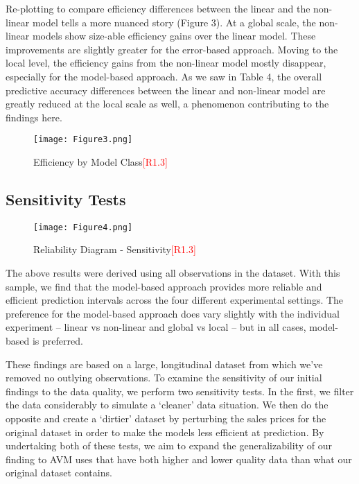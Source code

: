 \documentclass[colTwo]{anon}
\theoremstyle{definition}
\begin{document}
Re-plotting to compare efficiency differences between the linear and the non-linear model tells a more nuanced story (Figure 3). At a global scale, the non-linear models show size-able efficiency gains over the linear model. These improvements are slightly greater for the error-based approach. Moving to the local level, the efficiency gains from the non-linear model mostly disappear, especially for the model-based approach. As we saw in Table 4, the overall predictive accuracy differences between the linear and non-linear model are greatly reduced at the local scale as well, a phenomenon contributing to the findings here. 

\begin{figure}[h!]
\centering
\texttt{[image: Figure3.png]}
\caption{Efficiency by Model Class\textcolor{red}{[R1.3]}}
\label{fig:effmc}
\end{figure}

\subsection{Sensitivity Tests}

\begin{figure*}[h!]
\centering
\texttt{[image: Figure4.png]}
\caption{Reliability Diagram - Sensitivity\textcolor{red}{[R1.3]}}
\label{fig:calibsens}
\end{figure*}

The above results were derived using all observations in the dataset.  With this sample, we find that the model-based approach provides more reliable and efficient prediction intervals across the four different experimental settings.  The preference for the model-based approach does vary slightly with the individual experiment -- linear vs non-linear and global vs local -- but in all cases, model-based is preferred.  

These findings are based on a large, longitudinal dataset from which we’ve removed no outlying observations.  To examine the sensitivity of our initial findings to the data quality, we perform two sensitivity tests.  In the first, we filter the data considerably to simulate a ‘cleaner’ data situation.  We then do the opposite and create a ‘dirtier’ dataset by perturbing the sales prices for the original dataset in order to make the models less efficient at prediction.  By undertaking both of these tests, we aim to expand the generalizability of our finding to AVM uses that have both higher and lower quality data than what our original dataset contains.
\end{document}
